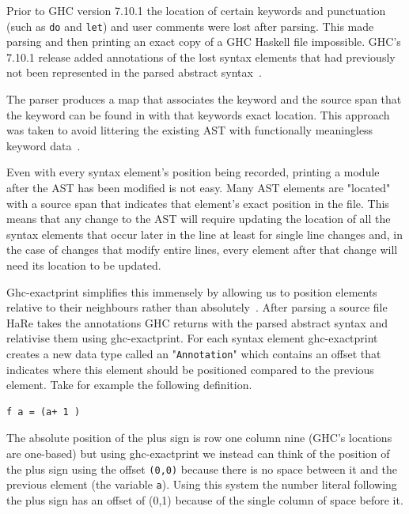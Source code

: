 Prior to GHC version 7.10.1 the location of certain keywords and punctuation (such as \texttt{do} and \texttt{let}) and user comments were lost after parsing. This made parsing and then printing an exact copy of a GHC Haskell file impossible. GHC's 7.10.1 release added annotations of the lost syntax elements that had previously not been represented in the parsed abstract syntax~\citep{apiAnns}. 

The parser produces a map that associates the keyword and the source span that the keyword can be found in with that keywords exact location. This approach was taken to avoid littering the existing AST with functionally meaningless keyword data~\citep{apiAnns}. 

Even with every syntax element's position being recorded, printing a module after the AST has been modified is not easy. Many AST elements are "located" with a source span that indicates that element's exact position in the file. This means that any change to the AST will require updating the location of all the syntax elements that occur later in the line at least for single line changes and, in the case of changes that modify entire lines, every element after that change will need its location to be updated.

Ghc-exactprint simplifies this immensely by allowing us to position elements relative to their neighbours rather than absolutely~\citep{exactprint}. After parsing a source file HaRe takes the annotations GHC returns with the parsed abstract syntax and relativise them using ghc-exactprint. For each syntax element ghc-exactprint creates a new data type called an "\texttt{Annotation}" which contains an offset that indicates where this element should be positioned compared to the previous element. Take for example the following definition.

\begin{lstlisting} 
f a = (a+ 1 )
\end{lstlisting}

The absolute position of the plus sign is row one column nine (GHC's locations are one-based) but using ghc-exactprint we instead can think of the position of the plus sign using the offset \texttt{(0,0)} because there is no space between it and the previous element (the variable \texttt{a}). Using this system the number literal following the plus sign has an offset of (0,1) because of the single column of space before it. 


